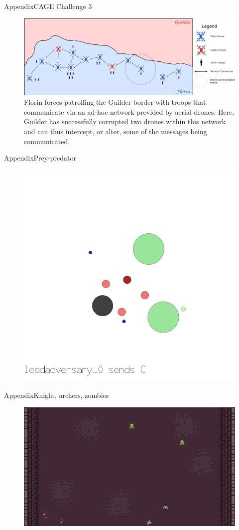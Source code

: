 \begin{frame}{Appendix}{CAGE Challenge 3}
    \begin{figure}
        \includegraphics[width=0.9\linewidth]{figures/cage_challenge_3.png}
        \caption*{Florin forces patrolling the Guilder border with troops that communicate via an ad-hoc network provided by aerial drones. Here, Guilder has successfully corrupted two drones within this network and can thus intercept, or alter, some of the messages being communicated.}
    \end{figure}
\end{frame}

\begin{frame}{Appendix}{Prey-predator}
    \begin{figure}
        \includegraphics[width=0.5\linewidth]{figures/mpe_simple_world_comm.png}
    \end{figure}
\end{frame}

\begin{frame}{Appendix}{Knight, archers, zombies}
    \begin{figure}
        \includegraphics[width=0.8\linewidth]{figures/butterfly_knights_archers_zombies.png}
    \end{figure}
\end{frame}


